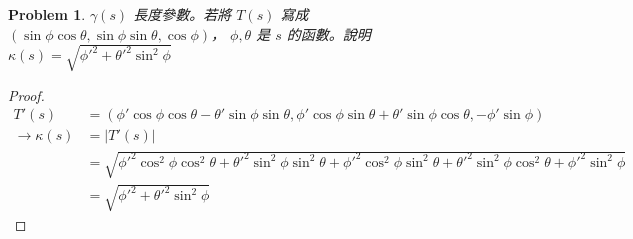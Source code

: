 \documentclass[10pt,a4paper]{article}
\newcounter{theProblemCounter}
\newtheorem{problem}[theProblemCounter]{Problem}
\begin{document}
\setcounter{theProblemCounter}{5}
\begin{problem}
$\gamma(s)$ 長度參數。若將 $T(s)$ 寫成 $(\sin\phi\cos\theta, \sin\phi\sin\theta, \cos\phi)$， $\phi,\theta$ 是 $s$ 的函數。說明 $\kappa(s)=\sqrt{\phi'^2+\theta'^2\sin^2\phi}$
\end{problem}
\begin{proof}
\begin{align*}
T'(s)&=(\phi'\cos\phi\cos\theta-\theta'\sin\phi\sin\theta,\phi'\cos\phi\sin\theta+\theta'\sin\phi\cos\theta,-\phi'\sin\phi)\\
\rightarrow\kappa(s)&=\left|T'(s)\right|\\
&=\sqrt{\phi'^2\cos^2\phi\cos^2\theta+\theta'^2\sin^2\phi\sin^2\theta+\phi'^2\cos^2\phi\sin^2\theta+\theta'^2\sin^2\phi\cos^2\theta+\phi'^2\sin^2\phi}\\
&=\sqrt{\phi'^2+\theta'^2\sin^2\phi}
\end{align*}
\end{proof}
\end{document}

